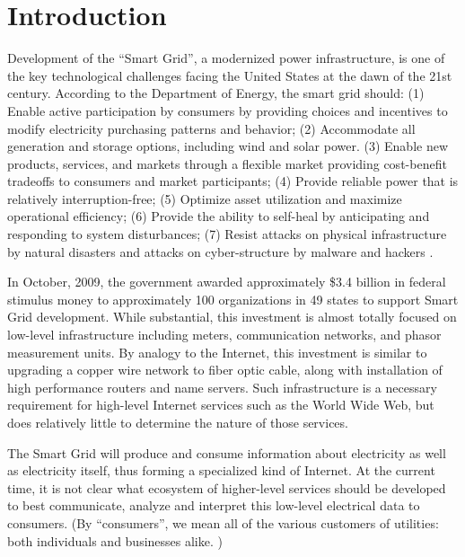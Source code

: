 
\section{Introduction}

Development of the ``Smart Grid'', a modernized power infrastructure, is
one of the key technological challenges facing the United States at the
dawn of the 21st century. According to the Department of Energy, the smart
grid should: (1) Enable active participation by consumers by providing
choices and incentives to modify electricity purchasing patterns and
behavior; (2) Accommodate all generation and storage options, including
wind and solar power.  (3) Enable new products, services, and markets
through a flexible market providing cost-benefit tradeoffs to consumers and
market participants; (4) Provide reliable power that is relatively
interruption-free; (5) Optimize asset utilization and maximize operational
efficiency; (6) Provide the ability to self-heal by anticipating and
responding to system disturbances; (7) Resist attacks on physical
infrastructure by natural disasters and attacks on cyber-structure by
malware and hackers \cite{NETL:GridCharacteristics}.

In October, 2009, the government awarded approximately \$3.4 billion in
federal stimulus money to approximately 100 organizations in 49 states to
support Smart Grid development.  While substantial, this investment is
almost totally focused on low-level infrastructure including meters,
communication networks, and phasor measurement units.  By analogy to the
Internet, this investment is similar to upgrading a copper wire network to
fiber optic cable, along with installation of high performance routers and
name servers.  Such infrastructure is a necessary requirement for
high-level Internet services such as the World Wide Web, but does
relatively little to determine the nature of those services.

The Smart Grid will produce and consume information about electricity as
well as electricity itself, thus forming a specialized kind of Internet. At
the current time, it is not clear what ecosystem of higher-level services
should be developed to best communicate, analyze and interpret this
low-level electrical data to consumers.  (By ``consumers'', we mean all of
the various customers of utilities: both individuals and businesses
alike. )

